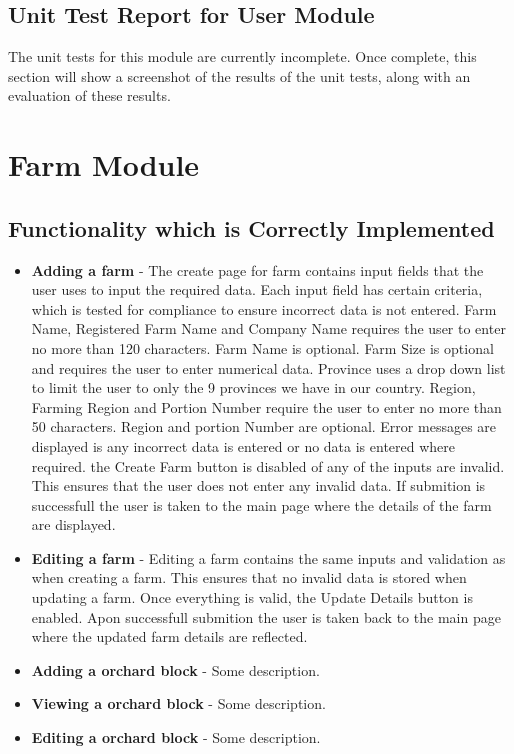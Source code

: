 \documentclass[11pt,fleqn]{book} %
\begin{document}
	\section{Unit Test Report for User Module}
		The unit tests for this module are currently incomplete. Once complete, this section will show a screenshot of the results of the unit tests, along with an evaluation of these results.


\chapter{Farm Module}
	\section{Functionality which is Correctly Implemented}
		\begin{itemize}
			\item\textbf{Adding a farm} -
			The create page for farm contains input fields that the user uses to input the required data. Each input field has certain criteria, which is tested for compliance to ensure incorrect data is not entered. Farm Name, Registered Farm Name and Company Name requires the user to enter no more than 120 characters. Farm Name is optional. Farm Size is optional and requires the user to enter numerical data. Province uses a drop down list to limit the user to only the 9 provinces we have in our country. Region, Farming Region and Portion Number require the user to enter no more than 50 characters. Region and portion Number are optional. Error messages are displayed is any incorrect data is entered or no data is entered where required. the Create Farm button is disabled of any of the inputs are invalid. This ensures that the user does not enter any invalid data. If submition is successfull the user is taken to the main page where the details of the farm are displayed.
			
			
			\item\textbf{Editing a farm} -
			Editing a farm contains the same inputs and validation as when creating a farm. This ensures that no invalid data is stored when updating a farm. Once everything is valid, the Update Details button is enabled. Apon successfull submition the user is taken back to the main page where the updated farm details are reflected.
			
			\item\textbf{Adding a orchard block} -
			Some description. 
			
			\item\textbf{Viewing a orchard block} -
			Some description.
			
			\item\textbf{Editing a orchard block} -
			Some description.
		\end{itemize}
\end{document}
